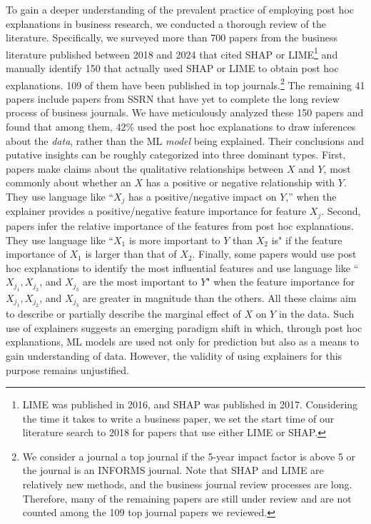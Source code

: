 \documentclass[mnsc,blindrev]{informs3}
\begin{document}
To gain a deeper understanding of the prevalent practice of employing post hoc explanations in business research, we conducted a thorough review of the literature. Specifically, we surveyed more than 700 papers from the business literature published between 2018 and 2024  that cited SHAP or LIME\footnote{LIME was published in 2016, and SHAP was published in 2017. Considering the time it takes to write a business paper, we set the start time of our literature search to 2018 for papers that use either LIME or SHAP.}  and manually identify 150 that actually used SHAP or LIME to obtain post hoc explanations. 109 of them have been published in top journals.\footnote{We consider a journal a top journal if the 5-year impact factor is above 5 or the journal is an INFORMS journal. Note that SHAP and LIME are relatively new methods, and the business journal review processes are long. Therefore, many of the remaining papers are still under review and are not counted among the 109 top journal papers we reviewed.} The remaining 41 papers include papers from SSRN that have yet to complete the long review process of business journals. We have meticulously analyzed these 150 papers and found that among them, 42\% used the post hoc explanations to draw inferences about the \textit{data}, rather than the ML \textit{model} being explained. Their conclusions and putative insights can be roughly categorized into three dominant types. First, papers make claims about the qualitative relationships between $X$ and $Y$, most commonly about whether an $X$ has a positive or negative relationship with $Y$. They use language like ``$X_j$ has a positive/negative impact on $Y$,'' when the explainer provides a positive/negative feature importance for feature $X_j$. Second, papers infer the relative importance of the features from post hoc explanations. They use language like ``$X_1$ is more important to $Y$ than $X_2$ is" if the feature importance of $X_1$ is larger than that of $X_2$. Finally, some papers would use post hoc explanations to identify the most influential features and use language like ``$X_{j_1}, X_{j_2}$, and $X_{j_3}$ are the most important to $Y$" when the feature importance for $X_{j_1}, X_{j_2}$, and $X_{j_3}$ are greater in magnitude than the others. All these claims aim to describe or partially describe the marginal effect of $X$ on $Y$ in the data. 
Such use of explainers suggests an emerging paradigm shift in which, through post hoc explanations, ML models are used not only for prediction but also as a means to gain understanding of data. However, the validity of using explainers for this purpose remains unjustified. 
\end{document}
